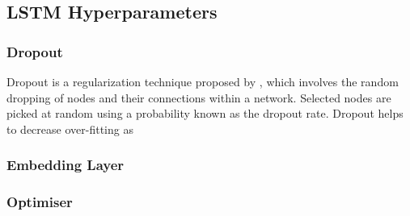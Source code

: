 \subsection{LSTM Hyperparameters}
\subsubsection{Dropout}
Dropout is a regularization technique proposed by \cite{Srivastava2014}, which involves the random dropping of nodes and their connections within a network. Selected nodes are picked at random using a probability known as the dropout rate. Dropout helps to decrease over-fitting as 
\subsubsection{Embedding Layer}
\subsubsection{Optimiser}

